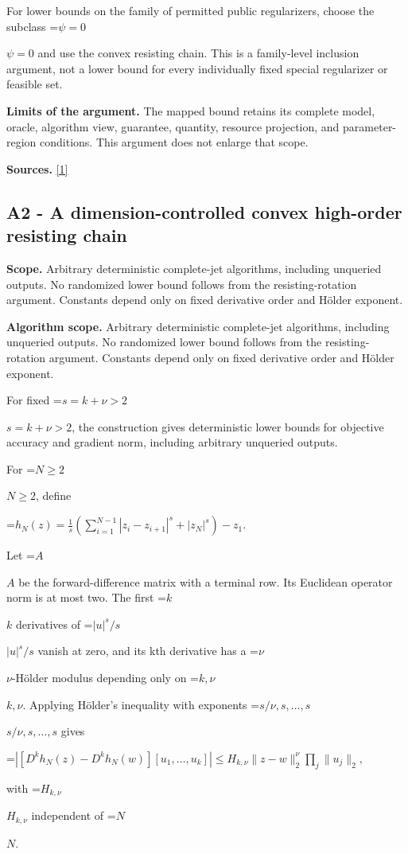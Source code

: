 \documentclass[10pt,a4paper]{article}
\newcommand{\AtlasMath}[1]{\par\begingroup\centering\setbox0=\hbox{$\displaystyle #1$}\ifdim\wd0>1.4\linewidth\typeout{ATLAS WIDE FORMULA: \the\wd0}\fi\ifdim\wd0>\linewidth\resizebox{\linewidth}{!}{\box0}\else\box0\fi\par\endgroup}
\newcommand{\AtlasInlineMath}[1]{\begingroup\setbox0=\hbox{$#1$}\ifdim\wd0>.4\linewidth\endgroup\AtlasMath{#1}\else\endgroup$#1$\fi}
\begin{document}
For lower bounds on the family of permitted public regularizers, choose the subclass \AtlasInlineMath{\psi=0} and use the convex resisting chain. This is a family-level inclusion argument, not a lower bound for every individually fixed special regularizer or feasible set.

\textbf{Limits of the argument.} The mapped bound retains its complete model, oracle, algorithm view, guarantee, quantity, resource projection, and parameter-region conditions. This argument does not enlarge that scope.

\textbf{Sources.} \href{https://arxiv.org/pdf/2411.08987v2}{[1]}

\subsection{A2 - A dimension-controlled convex high-order resisting chain}
\textbf{Scope.} Arbitrary deterministic complete-jet algorithms, including unqueried outputs. No randomized lower bound follows from the resisting-rotation argument. Constants depend only on fixed derivative order and Hölder exponent.

\textbf{Algorithm scope.} Arbitrary deterministic complete-jet algorithms, including unqueried outputs. No randomized lower bound follows from the resisting-rotation argument. Constants depend only on fixed derivative order and Hölder exponent.

For fixed \AtlasInlineMath{s=k+\nu>2}, the construction gives deterministic lower bounds for objective accuracy and gradient norm, including arbitrary unqueried outputs.

For \AtlasInlineMath{N\ge2}, define

\AtlasMath{h_N(z)=\frac1s\left(\sum_{i=1}^{N-1}|z_i-z_{i+1}|^s+|z_N|^s\right)-z_1.}

Let \AtlasInlineMath{A} be the forward-difference matrix with a terminal row. Its Euclidean operator norm is at most two. The first \AtlasInlineMath{k} derivatives of \AtlasInlineMath{|u|^s/s} vanish at zero, and its kth derivative has a \AtlasInlineMath{\nu}-Hölder modulus depending only on \AtlasInlineMath{k,\nu}. Applying Hölder's inequality with exponents \AtlasInlineMath{s/\nu,s,\ldots,s} gives

\AtlasMath{|[D^kh_N(z)-D^kh_N(w)][u_1,\ldots,u_k]|
\le H_{k,\nu}\|z-w\|_2^\nu\prod_j\|u_j\|_2,}

with \AtlasInlineMath{H_{k,\nu}} independent of \AtlasInlineMath{N}.
\end{document}
